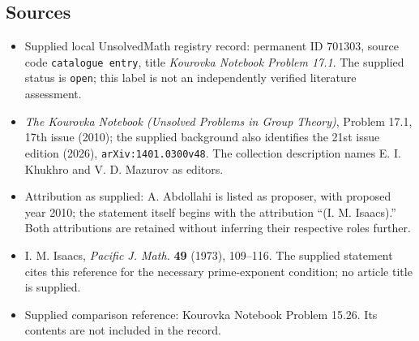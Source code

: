 \documentclass[11pt]{article}
\begin{document}
\subsection{Sources}
\begin{itemize}
\item Supplied local UnsolvedMath registry record: permanent ID \(701303\), source code \texttt{catalogue entry}, title \emph{Kourovka Notebook Problem 17.1}. The supplied status is \texttt{open}; this label is not an independently verified literature assessment.
\item \emph{The Kourovka Notebook (Unsolved Problems in Group Theory)}, Problem 17.1, 17th issue (2010); the supplied background also identifies the 21st issue edition (2026), \texttt{arXiv:1401.0300v48}. The collection description names E. I. Khukhro and V. D. Mazurov as editors.
\item Attribution as supplied: A. Abdollahi is listed as proposer, with proposed year 2010; the statement itself begins with the attribution ``(I. M. Isaacs).'' Both attributions are retained without inferring their respective roles further.
\item I. M. Isaacs, \emph{Pacific J. Math.} \textbf{49} (1973), 109--116. The supplied statement cites this reference for the necessary prime-exponent condition; no article title is supplied.
\item Supplied comparison reference: Kourovka Notebook Problem 15.26. Its contents are not included in the record.
\end{itemize}
\end{document}
